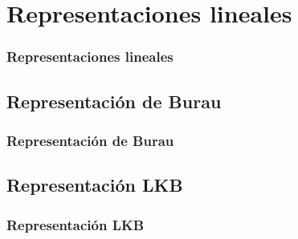 \documentclass{beamer}
\theoremstyle{definition}
\begin{document}
\section{Representaciones lineales}
\begin{frame}
\frametitle{Representaciones lineales}
\end{frame}


\subsection{Representación de Burau}
\begin{frame}
\frametitle{Representación de Burau}
\end{frame}

\subsection{Representación LKB}
\begin{frame}
\frametitle{Representación LKB}
\end{frame}
\end{document}
